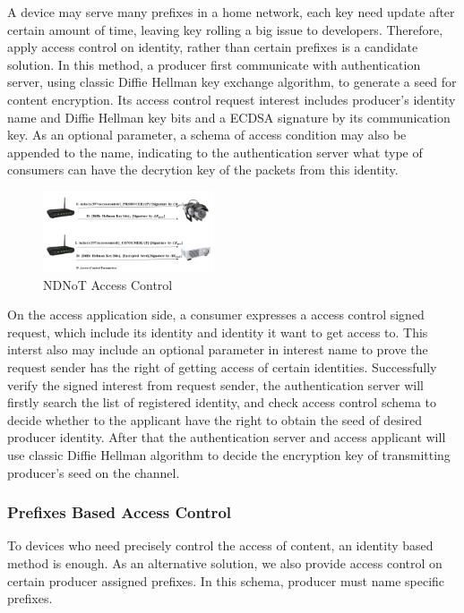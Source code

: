 \documentclass[sigconf]{acmart}
\begin{document}
A device may serve many prefixes in a home network, each key need update after certain amount of time, leaving key rolling a big issue to developers. Therefore, apply access control on identity, rather than 
certain prefixes is a candidate solution. In this method, a producer first communicate with authentication server, using classic Diffie Hellman key exchange algorithm, to generate a seed for content encryption.
Its access control request interest includes producer's identity name and Diffie Hellman key bits and a ECDSA signature by its communication key. As an optional parameter, a schema of access condition may also 
be appended to the name, indicating to the authentication server what type of consumers can have the decrytion key of the packets from this identity.

\begin{figure}[h]
	\vspace{-0.1cm}
	\centering
	\includegraphics[width=0.45\textwidth]{figures/access-control}
	\caption{NDNoT Access Control}
	\vspace{-0.1cm}
	\label{fig:Access-Control}
\end{figure}

On the access application side, a consumer expresses a access control signed request, which include its identity and identity it want to get access to. This interst also may include an optional parameter in interest 
name to prove the request sender has the right of getting access of certain identities. Successfully verify the signed interest from request sender, the authentication server will firstly search the list of registered 
identity, and check access control schema to decide whether to the applicant have the right to obtain the seed of desired producer identity. After that the authentication server and access applicant will use classic 
Diffie Hellman algorithm to decide the encryption key of transmitting producer's seed on the channel.

\subsubsection{Prefixes Based Access Control}
To devices who need precisely control the access of content, an identity based method is enough. As an alternative solution, we also provide access control on certain producer assigned prefixes. In this schema, producer 
must name specific prefixes.
\end{document}
